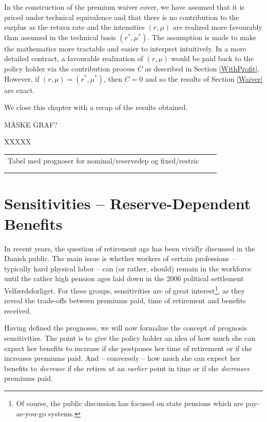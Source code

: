 \documentclass{article}
\newcommand{\1}[1]{\mathbbm{1}_{\left\lbrace #1 \right\rbrace}}
\theoremstyle{break}
\theoremstyle{remark}
\newenvironment{remark}
  {\pushQED{\qed}\renewcommand{\qedsymbol}{\scalebox{1.4}{$\circ$}}\remarkx}
  {\popQED\endremarkx}
\numberwithin{equation}{section}
\begin{document}
\begin{remark}
	In the construction of the premium waiver cover, we have assumed that it is priced under technical equivalence and that there is no contribution to the surplus as the return rate and the intensities $(r,\mu)$ are realized more favourably than assumed in the technical basis $(r^*,\mu^*)$. The assumption is made to make the mathematics more tractable and easier to interpret intuitively. In a more detailed contract, a favourable realization of $(r,\mu)$ would be paid back to the policy holder via the contribution process $C$ as described in Section \ref{WithProfit}. However, if $(r,\mu)=(r^*,\mu^*)$, then $C=0$ and so the results of Section \ref{Waiver} are exact.
\end{remark}

We close this chapter with a recap of the results obtained.

MÅSKE GRAF?

XXXXX
\begin{table}[]
	\begin{tabular}{lll}
	Tabel med prognoser for nominal/reservedep og fixed/restric	&  &  \\
		&  &  \\
		&  & 
	\end{tabular}
\end{table}

\newpage
\section{Sensitivities -- Reserve-Dependent Benefits}

In recent years, the question of retirement age has been vividly discussed in the Danish public. The main issue is whether workers of certain professions -- typically hard physical labor -- can (or rather, should) remain in the workforce until the rather high pension ages laid down in the 2006 political settlement Velfærdsforliget. For these groups, sensitivities are of great interest\footnote{Of course, the public discussion has focused on state pensions which are pay-as-you-go systems.}, as they reveal the trade-offs between premiums paid, time of retirement and benefits received.

Having defined the prognoses, we will now formalize the concept of prognosis sensitivities. The point is to give the policy holder an idea of how much she can expect her benefits to increase if she postpones her time of retirement or if she increases premiums paid. And -- conversely -- how much she can expect her benefits to \textit{decrease} if she retires at an \textit{earlier} point in time or if she \textit{decreases} premiums paid.
\end{document}
